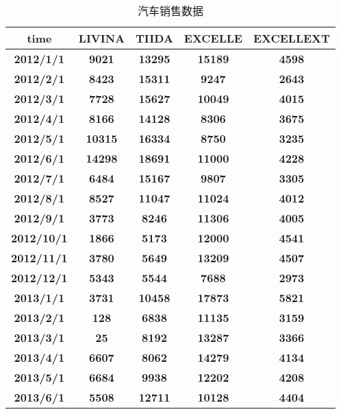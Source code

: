 \begin{table}[htbp]
  \centering
  \caption{汽车销售数据}
    \begin{tabular}{ccccc}
    \toprule
    \textbf{time} & LIVINA & TIIDA & EXCELLE & EXCELLEXT \\
    \midrule
    \textbf{2012/1/1} & \textbf{9021} & \textbf{13295} & \textbf{15189} & \textbf{4598} \\
    \textbf{2012/2/1} & \textbf{8423} & \textbf{15311} & \textbf{9247} & \textbf{2643} \\
    \textbf{2012/3/1} & \textbf{7728} & \textbf{15627} & \textbf{10049} & \textbf{4015} \\
    \textbf{2012/4/1} & \textbf{8166} & \textbf{14128} & \textbf{8306} & \textbf{3675} \\
    \textbf{2012/5/1} & \textbf{10315} & \textbf{16334} & \textbf{8750} & \textbf{3235} \\
    \textbf{2012/6/1} & \textbf{14298} & \textbf{18691} & \textbf{11000} & \textbf{4228} \\
    \textbf{2012/7/1} & \textbf{6484} & \textbf{15167} & \textbf{9807} & \textbf{3305} \\
    \textbf{2012/8/1} & \textbf{8527} & \textbf{11047} & \textbf{11024} & \textbf{4012} \\
    \textbf{2012/9/1} & \textbf{3773} & \textbf{8246} & \textbf{11306} & \textbf{4005} \\
    \textbf{2012/10/1} & \textbf{1866} & \textbf{5173} & \textbf{12000} & \textbf{4541} \\
    \textbf{2012/11/1} & \textbf{3780} & \textbf{5649} & \textbf{13209} & \textbf{4507} \\
    \textbf{2012/12/1} & \textbf{5343} & \textbf{5544} & \textbf{7688} & \textbf{2973} \\
    \textbf{2013/1/1} & \textbf{3731} & \textbf{10458} & \textbf{17873} & \textbf{5821} \\
    \textbf{2013/2/1} & \textbf{128} & \textbf{6838} & \textbf{11135} & \textbf{3159} \\
    \textbf{2013/3/1} & \textbf{25} & \textbf{8192} & \textbf{13287} & \textbf{3366} \\
    \textbf{2013/4/1} & \textbf{6607} & \textbf{8062} & \textbf{14279} & \textbf{4134} \\
    \textbf{2013/5/1} & \textbf{6684} & \textbf{9938} & \textbf{12202} & \textbf{4208} \\
    \textbf{2013/6/1} & \textbf{5508} & \textbf{12711} & \textbf{10128} & \textbf{4404} \\

\end{tabular}
\end{table}
